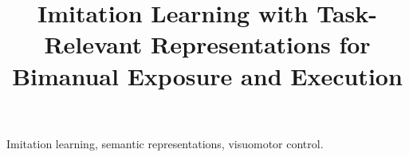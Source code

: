\documentclass[journal,10pt]{IEEEtran}
\title{Imitation Learning with Task-Relevant Representations for Bimanual Exposure and Execution}
\author{}
\newcommand{\draftnote}[1]{\par\smallskip{\small（\CJKunderline{#1}）}\par\smallskip}
\begin{document}
\maketitle
\begin{abstract}
\end{abstract}
\begin{IEEEkeywords}
Imitation learning, semantic representations, visuomotor control.
\end{IEEEkeywords}






\FloatBarrier
\appendices




\clearpage


\end{document}

